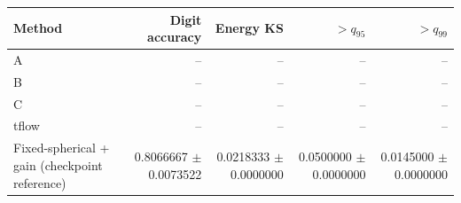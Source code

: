 \begin{tabular}{lrrrr}
\toprule
Method & Digit accuracy & Energy KS & $>q_{95}$ & $>q_{99}$ \\
\midrule
A & -- & -- & -- & -- \\
B & -- & -- & -- & -- \\
C & -- & -- & -- & -- \\
tflow & -- & -- & -- & -- \\
Fixed-spherical + gain (checkpoint reference) & 0.8066667 $\pm$ 0.0073522 & 0.0218333 $\pm$ 0.0000000 & 0.0500000 $\pm$ 0.0000000 & 0.0145000 $\pm$ 0.0000000 \\
\bottomrule
\end{tabular}
